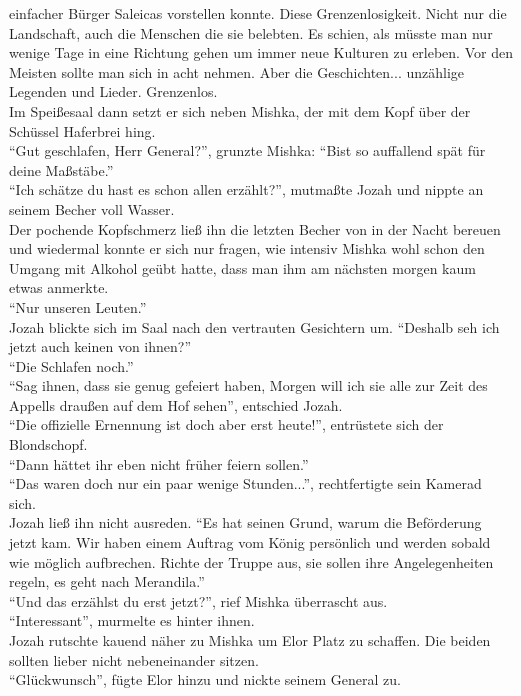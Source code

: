 einfacher Bürger Saleicas vorstellen konnte. Diese Grenzenlosigkeit. Nicht nur die Landschaft, auch 
die Menschen die sie belebten. Es schien, als müsste man nur wenige Tage in eine Richtung gehen um 
immer neue Kulturen zu erleben. Vor den Meisten sollte man sich in acht nehmen. Aber die 
Geschichten... unzählige Legenden und Lieder. Grenzenlos.\\
Im Speißesaal dann setzt er sich neben Mishka, der mit dem Kopf über der Schüssel Haferbrei hing.\\
``Gut geschlafen, Herr General?'', grunzte Mishka: ``Bist so auffallend spät für deine Maßstäbe.''\\
``Ich schätze du hast es schon allen erzählt?'', mutmaßte Jozah und nippte an seinem Becher voll 
Wasser.\\
Der pochende Kopfschmerz ließ ihn die letzten Becher von in der Nacht bereuen und wiedermal konnte 
er sich nur fragen, wie intensiv Mishka wohl schon den Umgang mit Alkohol geübt hatte, dass man ihm 
am nächsten morgen kaum etwas anmerkte.\\
``Nur unseren Leuten.''\\
Jozah blickte sich im Saal nach den vertrauten Gesichtern um. ``Deshalb seh ich jetzt auch keinen 
von ihnen?''\\
``Die Schlafen noch.''\\
``Sag ihnen, dass sie genug gefeiert haben, Morgen will ich sie alle zur Zeit des Appells draußen 
auf dem Hof sehen'', entschied Jozah.\\
``Die offizielle Ernennung ist doch aber erst heute!'', entrüstete sich der Blondschopf.\\
``Dann hättet ihr eben nicht früher feiern sollen.''\\
``Das waren doch nur ein paar wenige Stunden...'', rechtfertigte sein Kamerad sich.\\
Jozah ließ ihn nicht ausreden. ``Es hat seinen Grund, warum die Beförderung jetzt kam. Wir haben 
einem Auftrag vom König persönlich und werden sobald wie möglich aufbrechen. Richte der Truppe aus, 
sie sollen ihre Angelegenheiten regeln, es geht nach Merandila.''\\
``Und das erzählst du erst jetzt?'', rief Mishka überrascht aus.\\
``Interessant'', murmelte es hinter ihnen.\\
Jozah rutschte kauend näher zu Mishka um Elor Platz zu schaffen. Die beiden sollten lieber nicht 
nebeneinander sitzen.\\
``Glückwunsch'', fügte Elor hinzu und nickte seinem General zu.\\
